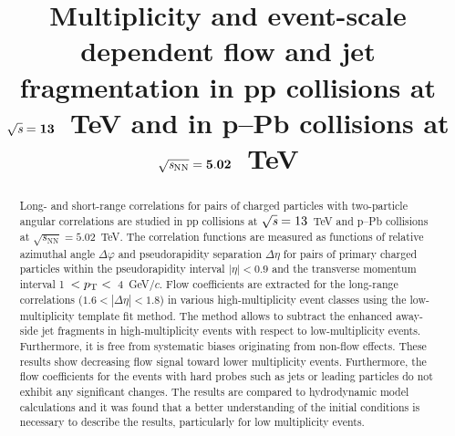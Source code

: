 \documentclass[ALICE,manyauthors]{cernphprep}
\begin{document}
\begin{titlepage}

\PHyear{}
\PHdate{\today}
%

\title{Multiplicity and event-scale dependent flow and jet fragmentation in pp collisions at ${\sqrt{{\textit s}}}=\mathbf{13}$~TeV and in p--Pb collisions at ${\sqrt{{\textit s_\mathrm{NN}}}} = \mathbf{5.02}$~TeV}


\begin{abstract}
%
Long- and short-range correlations for pairs of charged particles with two-particle angular correlations are studied in pp collisions at ${\sqrt{{\textit s}}}=13$~TeV and p--Pb collisions at ${\sqrt{s_\mathrm{NN}}} = 5.02$~TeV. The correlation functions are measured as functions of relative azimuthal angle $\Delta\varphi$ and pseudorapidity separation $\Delta\eta$ for pairs of primary charged particles within the pseudorapidity interval $|\eta| < 0.9$ and the transverse momentum interval 1~$ < p_\mathrm{T} < $~4~GeV/$c$.
Flow coefficients are extracted for the long-range correlations ($1.6 < |\Delta\eta| <1.8$) in various high-multiplicity event classes using the low-multiplicity template fit method. The method allows to subtract the enhanced away-side jet fragments in high-multiplicity events with respect to low-multiplicity events. Furthermore, it is free from systematic biases originating from non-flow effects. These results show decreasing flow signal toward lower multiplicity events. Furthermore, the flow coefficients for the events with hard probes such as jets or leading particles do not exhibit any significant changes. The results are compared to hydrodynamic model calculations and it was found that a better understanding of the initial conditions is necessary to describe the results, particularly for low multiplicity events.





\end{abstract}

\end{titlepage}
\end{document}
